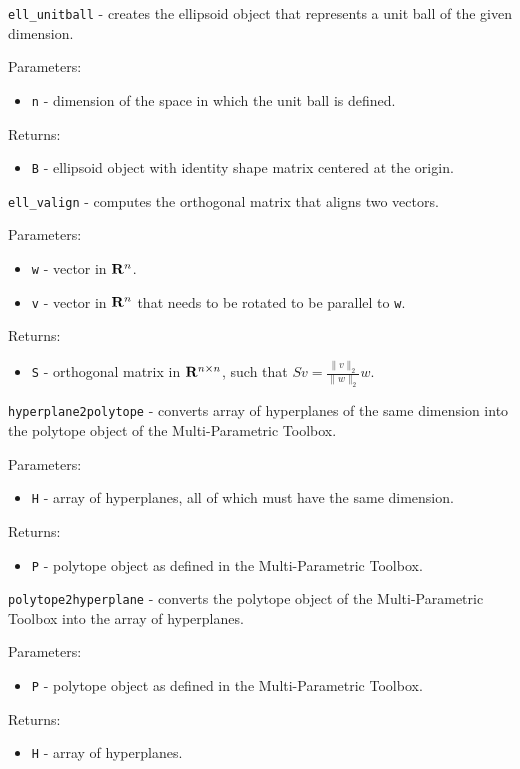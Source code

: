 \documentclass{report}
\begin{document}
\newpage

{\Large {\tt ell\_unitball}} - creates the ellipsoid object that represents
a unit ball of the given dimension.

Parameters:
\begin{itemize}
\item {\tt n} - dimension of the space in which the unit ball is defined.
\end{itemize}

Returns:
\begin{itemize}
\item {\tt B} - ellipsoid object with identity shape matrix centered at the
origin.
\end{itemize}

\newpage

{\Large {\tt ell\_valign}} - computes the orthogonal matrix that aligns two
vectors.

Parameters:
\begin{itemize}
\item {\tt w} - vector in ${\bf R}^n$.
\item {\tt v} - vector in ${\bf R}^n$ that needs to be rotated to be parallel
to {\tt w}.
\end{itemize}

Returns:
\begin{itemize}
\item {\tt S} - orthogonal matrix in ${\bf R}^{n\times n}$, such that
$Sv = \frac{\|v\|_2}{\|w\|_2}w$.
\end{itemize}

\newpage

{\Large {\tt hyperplane2polytope}} - converts array of hyperplanes of the
same dimension into the polytope object of the Multi-Parametric Toolbox.

Parameters:
\begin{itemize}
\item {\tt H} - array of hyperplanes, all of which must have the same dimension.
\end{itemize}

Returns:
\begin{itemize}
\item {\tt P} - polytope object as defined in the Multi-Parametric Toolbox.
\end{itemize}

\newpage

{\Large {\tt polytope2hyperplane}} - converts the polytope object of the
Multi-Parametric Toolbox into the array of hyperplanes.

Parameters:
\begin{itemize}
\item {\tt P} - polytope object as defined in the Multi-Parametric Toolbox.
\end{itemize}

Returns:
\begin{itemize}
\item {\tt H} - array of hyperplanes.
\end{itemize}
\end{document}

